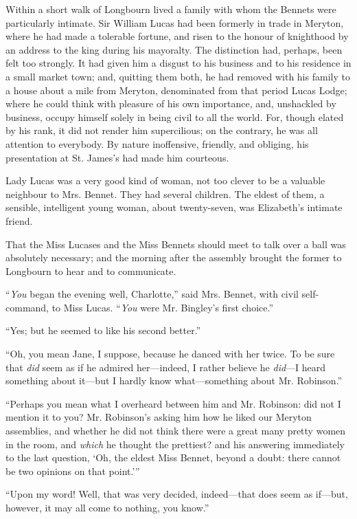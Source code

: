 Within a short walk of Longbourn lived a family with whom the Bennets were particularly intimate. Sir William Lucas had been formerly in trade in Meryton, where he had made a tolerable fortune, and risen to the honour of knighthood by an address to the king during his mayoralty. The distinction had, perhaps, been felt too strongly. It had given him a disgust to his business and to his residence in a small market town; and, quitting them both, he had removed with his family to a house about a mile from Meryton, denominated from that period Lucas Lodge; where he could think with pleasure of his own importance, and, unshackled by business, occupy himself solely in being civil to all the world. For, though elated by his rank, it did not render him supercilious; on the contrary, he was all attention to everybody. By nature inoffensive, friendly, and obliging, his presentation at St. James's had made him courteous.

Lady Lucas was a very good kind of woman, not too clever to be a valuable neighbour to Mrs. Bennet. They had several children. The eldest of them, a sensible, intelligent young woman, about twenty-seven, was Elizabeth's intimate friend.

That the Miss Lucases and the Miss Bennets should meet to talk over a ball was absolutely necessary; and the morning after the assembly brought the former to Longbourn to hear and to communicate.

``\textit{You} began the evening well, Charlotte,'' said Mrs. Bennet, with civil self-command, to Miss Lucas. ``\textit{You} were Mr. Bingley's first choice.''

``Yes; but he seemed to like his second better.''

``Oh, you mean Jane, I suppose, because he danced with her twice. To be sure that \textit{did} seem as if he admired her---indeed, I rather believe he \textit{did}---I heard something about it---but I hardly know what---something about Mr. Robinson.''

``Perhaps you mean what I overheard between him and Mr. Robinson: did not I mention it to you? Mr. Robinson's asking him how he liked our Meryton assemblies, and whether he did not think there were a great many pretty women in the room, and \textit{which} he thought the prettiest? and his answering immediately to the last question, `Oh, the eldest Miss Bennet, beyond a doubt: there cannot be two opinions on that point.'''

``Upon my word! Well, that was very decided, indeed---that does seem as if---but, however, it may all come to nothing, you know.''

